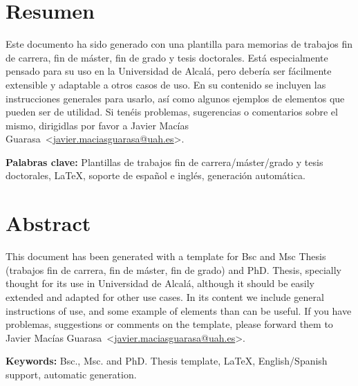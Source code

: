\documentclass[spanish,openright]{book}
\makeatletter
\newcommand{\myThesisKeywords}{Plantillas de trabajos fin de carrera/máster/grado y tesis doctorales, \LaTeX, soporte de español e inglés, generación automática} \newcommand{\myThesisKeywordsEnglish}{Bsc., Msc. and PhD. Thesis template, \LaTeX, English/Spanish support, automatic generation}
\newcommand{\myAuthorName}{Javier}
\newcommand{\myAuthorSurname}{Macías Guarasa}
\newcommand{\myAuthorFullName}{\myAuthorName{} \myAuthorSurname{}}
\newcommand{\myAuthorEmail}{javier.maciasguarasa@uah.es}
\newcommand{\mytoclinkcolor}{black}
\newcommand{\myloflinkcolor}{black}
\newcommand{\mylotlinkcolor}{black}
\newcommand{\mylinkcolor}{blue}
\newcommand{\contactauthor}{\myAuthorFullName~\textless\href{mailto:\myAuthorEmail}{\myAuthorEmail}\textgreater}
\makeatother
\begin{document}
 



\chapter*{Resumen}
\label{cha:resumen}


Este documento ha sido generado con una plantilla para memorias de
trabajos fin de carrera, fin de máster, fin de grado y tesis
doctorales. Está especialmente pensado para su uso en la Universidad de
Alcalá, pero debería ser fácilmente extensible y adaptable a otros casos
de uso. En su contenido se incluyen las instrucciones generales para
usarlo, así como algunos ejemplos de elementos que pueden ser de
utilidad. Si tenéis problemas, sugerencias o comentarios sobre el mismo,
dirigidlas por favor a \contactauthor.

\textbf{Palabras clave:} \myThesisKeywords.




 

\chapter*{Abstract}
\label{cha:abstract}


This document has been generated with a template for Bsc and Msc Thesis
(trabajos fin de carrera, fin de máster, fin de grado) and PhD. Thesis,
specially thought for its use in Universidad de Alcalá, although it
should be easily extended and adapted for other use cases. In its
content we include general instructions of use, and some example of
elements than can be useful. If you have problemas, suggestions or
comments on the template, please forward them to \contactauthor.


\textbf{Keywords:} \myThesisKeywordsEnglish.




 





\hypersetup{linkcolor=\mytoclinkcolor}
\tableofcontents

\hypersetup{linkcolor=\myloflinkcolor}
\listoffigures
                          
\hypersetup{linkcolor=\mylotlinkcolor}
\listoftables

\hypersetup{linkcolor=\mylinkcolor}
\end{document}
